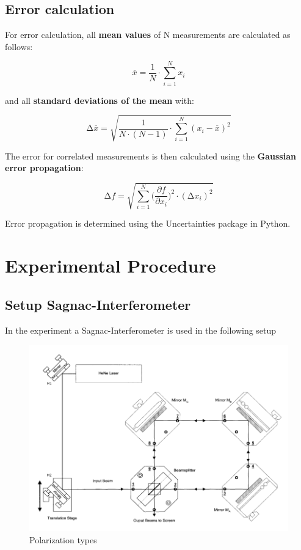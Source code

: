 \subsection{Error calculation}
For error calculation, all \textbf{mean values} of N measurements are calculated as follows:

\begin{equation}
    \overline{x} = \frac{1}{N} \cdot \sum_{i=1}^N x_i
    \label{eqn:Mittelwert}
\end{equation}

and all \textbf{standard deviations of the mean} with:

\begin{equation}
    \increment\overline{x} = \sqrt{\frac{1}{N\cdot(N-1)}\cdot\sum_{i=1}^N (x_i-\overline{x})^2}
    \label{eqn:St_Mittelwert}
\end{equation}

The error for correlated measurements is then calculated using the \textbf{Gaussian error propagation}:

\begin{equation}
    \increment{f} = \sqrt{ \sum_{i = 1}^{N}  \biggl(\frac{\partial{f}}{\partial{x_i}}\biggr)^2\cdot(\increment{x_i})^2}
    \label{eqn:Gauss}
\end{equation}

Error propagation is determined using the Uncertainties \cite{uncertainties} package in Python.


\section{Experimental Procedure}
\subsection{Setup Sagnac-Interferometer}
In the experiment a Sagnac-Interferometer is used in the following setup

\begin{figure}[H]
	\centering
	\includegraphics[width=\textwidth]{Bilder/Aufbau.png}
	\caption{Polarization types \cite{man:64}}\label{fig:Aufbau}
\end{figure}

